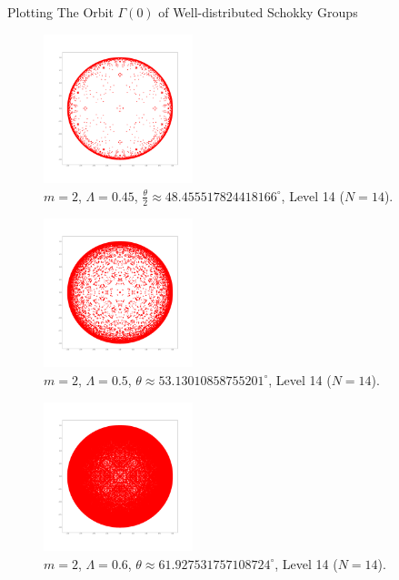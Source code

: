 \documentclass[final]{beamer}
\newlength{\onecolwid}
\begin{document}
\begin{frame}[t]
\begin{columns}[t]
\begin{column}{\onecolwid}
\begin{block}{Plotting The Orbit $\Gamma(0)$ of Well-distributed Schokky Groups}
\begin{multicols}{3}
\begin{figure}[H]
\centering
\includegraphics[width=0.386\textwidth]{Lambda=0.45,m=2,N=14.png}
\caption{{\scriptsize $m=2$, $\Lambda=0.45$, $\frac{\theta}{2}\approx 48.455517824418166^{\circ}$, Level 14 ($N=14$).}}
\end{figure}

\begin{figure}[H]
\centering
\includegraphics[width=0.386\textwidth]{Lambda=0.5,m=2,N=14.png}
\caption{{\scriptsize $m=2$, $\Lambda=0.5$, $\theta\approx 53.13010858755201^\circ$, Level 14 ($N=14$).}}
\end{figure}



\begin{figure}[H]
\centering
\includegraphics[width=0.386\textwidth]{Lambda=0.6,m=2,N=14.png}
\caption{{\scriptsize $m=2$, $\Lambda=0.6$, $\theta\approx 61.927531757108724^\circ$, Level 14 ($N=14$).}}
\end{figure}


\end{multicols}
\end{block}
\end{column}
\end{columns}
\end{frame}
\end{document}
